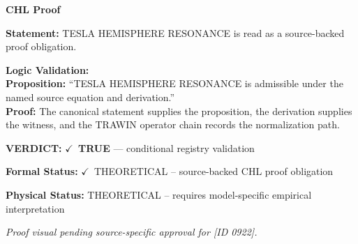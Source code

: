 \vspace{0.45em}
\noindent\textbf{CHL Proof}\par
\textbf{Statement:} TESLA HEMISPHERE RESONANCE is read as a source-backed proof obligation.

\textbf{Logic Validation:}\\
\textbf{Proposition:} ``TESLA HEMISPHERE RESONANCE is admissible under the named source equation and derivation.''\\
\textbf{Proof:} The canonical statement supplies the proposition, the derivation supplies the witness, and the TRAWIN operator chain records the normalization path.

\textbf{VERDICT:} \ensuremath{\checkmark}\ \textbf{TRUE} --- conditional registry validation

\textbf{Formal Status:} \ensuremath{\checkmark}\ THEORETICAL -- source-backed CHL proof obligation

\textbf{Physical Status:} THEORETICAL -- requires model-specific empirical interpretation
\par\vspace{0.45em}
\par
\vfill
\begingroup\footnotesize\itshape
Proof visual pending source-specific approval for [ID 0922].
\par\endgroup
\vfill
\endgroup
\endgroup
